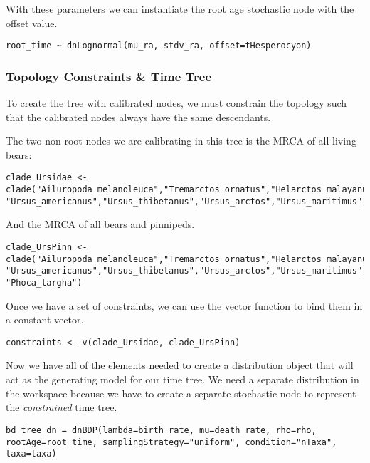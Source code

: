 With these parameters we can instantiate the root age stochastic node with the offset value.
{\tt \begin{snugshade*}
\begin{lstlisting}
root_time ~ dnLognormal(mu_ra, stdv_ra, offset=tHesperocyon)
\end{lstlisting}
\end{snugshade*}}


\subsubsection{Topology Constraints \& Time Tree}

To create the tree with calibrated nodes, we must constrain the topology such that the calibrated nodes always have the same descendants.

The two non-root nodes we are calibrating in this tree is the MRCA of all living bears:
{\tt \begin{snugshade*}
\begin{lstlisting}
clade_Ursidae <- clade("Ailuropoda_melanoleuca","Tremarctos_ornatus","Helarctos_malayanus", "Ursus_americanus","Ursus_thibetanus","Ursus_arctos","Ursus_maritimus","Melursus_ursinus")
\end{lstlisting}
\end{snugshade*}}

And the MRCA of all bears and pinnipeds. 
{\tt \begin{snugshade*}
\begin{lstlisting}
clade_UrsPinn <- clade("Ailuropoda_melanoleuca","Tremarctos_ornatus","Helarctos_malayanus", "Ursus_americanus","Ursus_thibetanus","Ursus_arctos","Ursus_maritimus","Melursus_ursinus", "Phoca_largha")
\end{lstlisting}
\end{snugshade*}}

Once we have a set of constraints, we can use the vector function  to bind them in a constant vector.
{\tt \begin{snugshade*}
\begin{lstlisting}
constraints <- v(clade_Ursidae, clade_UrsPinn)
\end{lstlisting}
\end{snugshade*}}

Now we have all of the elements needed to create a distribution object that will act as the generating model for our time tree. We need a separate distribution in the workspace because we have to create a separate stochastic node to represent the {\em constrained} time tree.
{\tt \begin{snugshade*}
\begin{lstlisting}
bd_tree_dn = dnBDP(lambda=birth_rate, mu=death_rate, rho=rho, rootAge=root_time, samplingStrategy="uniform", condition="nTaxa", taxa=taxa)
\end{lstlisting}
\end{snugshade*}}

